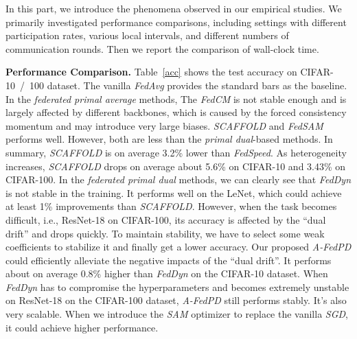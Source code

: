 In this part, we introduce the phenomena observed in our empirical studies. We primarily investigated performance comparisons, including settings with different participation rates, various local intervals, and different numbers of communication rounds. Then we report the comparison of wall-clock time.

\textbf{Performance Comparison.} Table~\ref{acc} shows the test accuracy on CIFAR-10\ /\ 100 dataset. The vanilla \textit{FedAvg} provides the standard bars as the baseline. In the \textit{federated primal average} methods, The \textit{FedCM} is not stable enough and is largely affected by different backbones, which is caused by the forced consistency momentum and may introduce very large biases. \textit{SCAFFOLD} and \textit{FedSAM} performs well. However, both are less than the \textit{primal dual}-based methods. In summary, \textit{SCAFFOLD} is on average 3.2\% lower than \textit{FedSpeed}. As heterogeneity increases, \textit{SCAFFOLD} drops on average about 5.6\% on CIFAR-10 and 3.43\% on CIFAR-100. In the \textit{federated primal dual} methods, we can clearly see that \textit{FedDyn} is not stable in the training. It performs well on the LeNet, which could achieve at least 1\% improvements than \textit{SCAFFOLD}. However, when the task becomes difficult, i.e., ResNet-18 on CIFAR-100, its accuracy is affected by the ``dual drift'' and drops quickly. To maintain stability, we have to select some weak coefficients to stabilize it and finally get a lower accuracy. Our proposed \textit{A-FedPD} could efficiently alleviate the negative impacts of the ``dual drift''. It performs about on average 0.8\% higher than \textit{FedDyn} on the CIFAR-10 dataset. When \textit{FedDyn} has to compromise the hyperparameters and becomes extremely unstable on ResNet-18 on the CIFAR-100 dataset, \textit{A-FedPD} still performs stably. It's also very scalable. When we introduce the \textit{SAM} optimizer to replace the vanilla \textit{SGD}, it could achieve higher performance.

